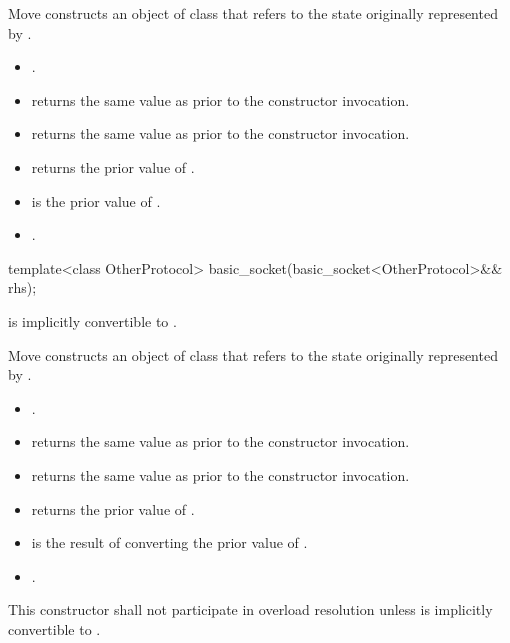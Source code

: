 \begin{itemdescr}
\pnum
\effects Move constructs an object of class  that refers to the state originally represented by .

\pnum
\postconditions 
\begin{itemize}
\item
{}.
\item
{} returns the same value as  prior to the constructor invocation.
\item
{} returns the same value as  prior to the constructor invocation.
\item
{} returns the prior value of .
\item
{} is the prior value of .
\item
{}.
\end{itemize}
\end{itemdescr}

\begin{itemdecl}
template<class OtherProtocol>
  basic_socket(basic_socket<OtherProtocol>&& rhs);
\end{itemdecl}

\begin{itemdescr}
\pnum
\requires {} is implicitly convertible to .

\pnum
\effects Move constructs an object of class  that refers to the state originally represented by .

\pnum
\postconditions 
\begin{itemize}
\item
{}.
\item
{} returns the same value as  prior to the constructor invocation.
\item
{} returns the same value as  prior to the constructor invocation.
\item
{} returns the prior value of .
\item
{} is the result of converting the prior value of .
\item
{}.
\end{itemize}

\pnum
\remarks This constructor shall not participate in overload resolution unless  is implicitly convertible to .
\end{itemdescr}



